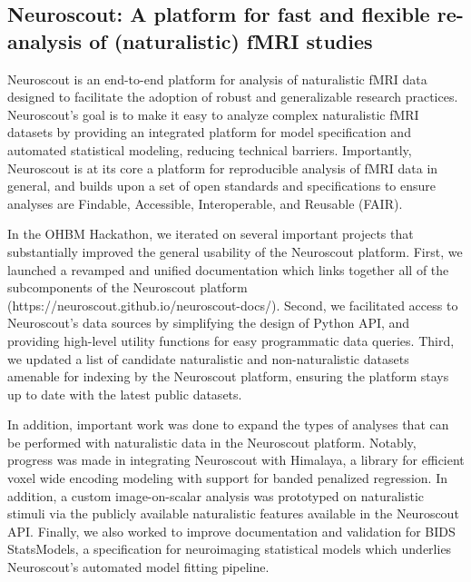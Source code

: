 \documentclass[../main.tex]{subfiles}
\begin{document}
\subsection{Neuroscout: A platform for fast and flexible re-analysis of (naturalistic) fMRI studies}


Neuroscout is an end-to-end platform for analysis of naturalistic fMRI data designed to facilitate the adoption of robust and generalizable research practices. Neuroscout’s goal is to make it easy to analyze complex naturalistic fMRI datasets by providing an integrated platform for model specification and automated statistical modeling, reducing technical barriers. Importantly, Neuroscout is at its core a platform for reproducible analysis of fMRI data in general, and builds upon a set of open standards and specifications to ensure analyses are Findable, Accessible, Interoperable, and Reusable (FAIR). 

In the OHBM Hackathon, we iterated on several important projects that substantially improved the general usability of the Neuroscout platform. First, we launched a revamped and unified documentation which links together all of the subcomponents of the Neuroscout platform (https://neuroscout.github.io/neuroscout-docs/). Second, we facilitated access to Neuroscout’s data sources by simplifying the design of Python API, and providing high-level utility functions for easy programmatic data queries. Third, we updated a list of candidate naturalistic and non-naturalistic datasets amenable for indexing by the Neuroscout platform, ensuring the platform stays up to date with the latest public datasets. 

In addition, important work was done to expand the types of analyses that can be performed with naturalistic data in the Neuroscout platform. Notably, progress was made in integrating Neuroscout with Himalaya, a library for efficient voxel wide encoding modeling with support for banded penalized regression. In addition, a custom image-on-scalar analysis was prototyped on naturalistic stimuli via the publicly available naturalistic features available in the Neuroscout API. Finally, we also worked to improve documentation and validation for BIDS StatsModels, a specification for neuroimaging statistical models which underlies Neuroscout’s automated model fitting pipeline. 
\end{document}

